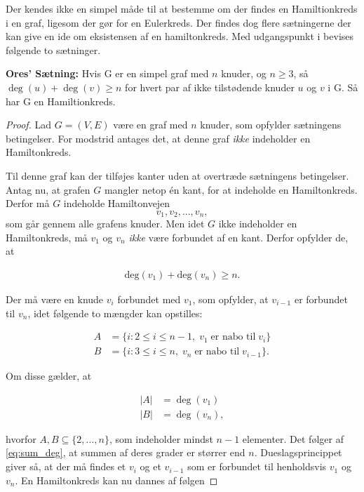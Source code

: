 Der kendes ikke en simpel måde til at bestemme om der findes en Hamiltionkreds i en graf, ligesom der gør for en Eulerkreds. 
Der findes dog flere sætningerne der kan give en ide om eksistensen af en hamiltonkreds. Med udgangspunkt i \cite{wilson_graph} bevises følgende to sætninger.

\begin{thm} \label{ores_thm}
	\textbf{Ores' Sætning:} 
	Hvis G er en simpel graf med $n$ knuder, og $n\geq3$, så\\ $\deg(u)+\deg(v)\geq n$ for hvert par af ikke tilstødende knuder $u$ og $v$ i G. 
	Så har G en Hamiltionkreds. 
\end{thm}

\begin{proof}
	Lad $G=(V,E)$ være en graf med $n$ knuder, som opfylder sætningens betingelser. For modstrid antages det, at denne graf \textit{ikke} indeholder en Hamiltonkreds.

	Til denne graf kan der tilføjes kanter uden at overtræde sætningens betingelser. Antag nu, at grafen $G$ mangler netop én kant, for at indeholde en Hamiltonkreds. 
	Derfor må $G$ indeholde Hamiltonvejen 
	$$v_1, v_2,...,v_n,$$
	som går gennem alle grafens knuder. 
	Men idet $G$ ikke indeholder en Hamiltonkreds, må $v_1$ og $v_n$ \textit{ikke} være forbundet af en kant.
	Derfor opfylder de, at

	\begin{align} \label{eq:sum_deg}
		\textrm{deg}(v_1)+\textrm{deg}(v_n)\geq n.
	\end{align}
	
	Der må være en knude $v_i$ forbundet med $v_1$, som opfylder, at $v_{i-1}$ er forbundet til $v_n$, idet følgende to mængder kan opstilles:

	\begin{align*}
		A &= \lbrace i: 2 \leq i \leq n-1, \; v_1 \; \textrm{er nabo til} \; v_i \rbrace \\
		B &= \lbrace i: 3 \leq i \leq n, \; v_n \; \textrm{er nabo til} \; v_{i-1} \rbrace.
	\end{align*}

	Om disse gælder, at

	\begin{align*}
		|A| &= \deg(v_1) \\
		|B| &= \deg(v_n),
	\end{align*}
	
	hvorfor $A,B \subseteq \lbrace 2,...,n \rbrace$, som indeholder mindst $n-1$ elementer.
	Det følger af \eqref{eq:sum_deg}, at summen af deres grader er størrer end $n$.
	Dueslagsprincippet giver så, at der må findes et $v_i$ og et $v_{i-1}$ som er forbundet til henholdsvis $v_1$ og $v_n$.
	En Hamiltonkreds kan nu dannes af følgen


\end{proof}
